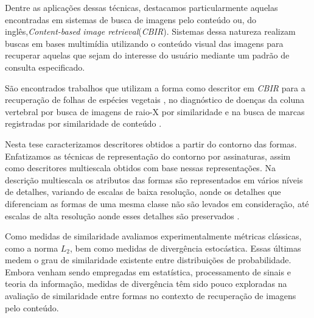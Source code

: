Dentre as aplicações dessas técnicas, destacamos particularmente aquelas encontradas em sistemas de busca de imagens pelo conteúdo ou, do inglês,\foreignlanguage{english}{\emph{Content-based image retrieval}}(\emph{CBIR}). Sistemas dessa natureza realizam buscas em bases multimídia utilizando o conteúdo visual das imagens para recuperar aquelas que sejam do interesse do usuário mediante um padrão de consulta especificado. 

São encontrados trabalhos que utilizam a forma como descritor em \emph{CBIR} para a recuperação de folhas de espécies vegetais \cite{Fotopoulou:2013, Nam2008245, Wang:2000}, no diagnóstico de doenças da coluna vertebral por busca de imagens de raio-X por similaridade \cite{Lee:2009} e na busca de marcas registradas por similaridade de conteúdo \cite{MohdAnuar2013105,Qi20102017}.

\begin{comment}
A demanda por novas maneiras de gerenciar e buscar informação multimidia surgiu com a popularização da internet, com a maior disponibilidade de dispositivos de captura de imagens e com a diminuição dos custos dos meios de armazenamento; aspectos esses que contribuíram para um volume crescente de imagens digitais disponibilizadas para as mais diversas finalidades.

Neste contexto, uma nova linha de pesquisa de sistemas de busca de informação desponta, denominada de recuperação de imagens pelo conteúdo ou, do inglês, \foreignlanguage{english}{\emph{Content-Based Image Retrieval}} (\emph{CBIR}). 
\end{comment}


Nesta tese caracterizamos descritores obtidos a partir do contorno das formas.  Enfatizamos as técnicas de representação do contorno por assinaturas, assim como descritores multiescala obtidos com base nessas representações. Na descrição multiescala os atributos das formas são representados em vários níveis de detalhes, variando de escalas de baixa resolução, aonde os detalhes que diferenciam as formas de uma mesma classe não são levados em consideração, até escalas de alta resolução aonde esses detalhes são preservados \cite{Ullman:1996}.
 
Como medidas de similaridade avaliamos experimentalmente métricas clássicas, como a norma $L_2$, bem como medidas de divergência estocástica. Essas últimas medem o grau de similaridade existente entre distribuições de probabilidade. Embora venham sendo empregadas em estatística, processamento de sinais e teoria da informação, medidas de divergência têm sido pouco exploradas na avaliação de similaridade entre formas no contexto de recuperação de imagens pelo conteúdo.  

